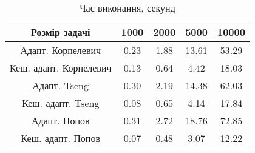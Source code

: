 \begin{table}[H]
	\centering
	\begin{tabular}{|c||c|c|c|c|}\hline
		Розмір задачі & 1000 & 2000 & 5000 & 10000 \\ \hline \hline
		Адапт. Корпелевич & 0.23 & 1.88 & 13.61 & 53.29 \\ \hline
		Кеш. адапт. Корпелевич & 0.13 & 0.64 & 4.42 & 18.03 \\ \hline
		Адапт. Tseng & 0.30 & 2.19 & 14.38 & 62.03 \\ \hline
		Кеш. адапт. Tseng & 0.08 & 0.65 & 4.14 & 17.84 \\ \hline
		Адапт. Попов & 0.31 & 2.72 & 18.76 & 72.85 \\ \hline
		Кеш. адапт. Попов & 0.07 & 0.48 & 3.07 & 12.22 \\ \hline
	\end{tabular}
	\caption{Час виконання, секунд}
\end{table}

